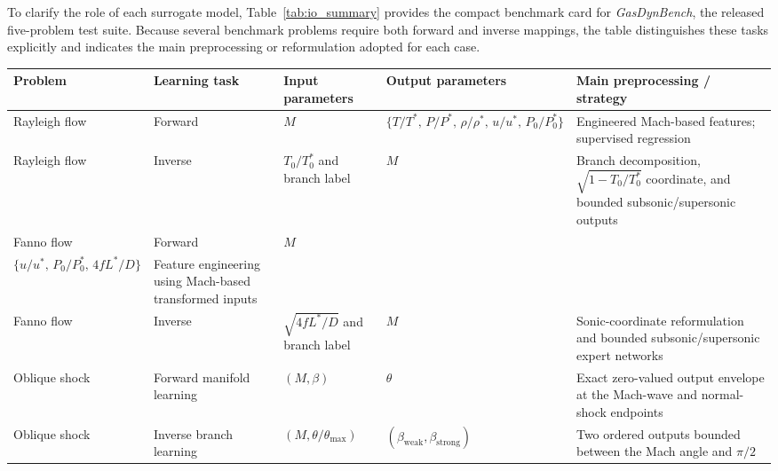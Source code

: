 \documentclass[preprint,12pt]{elsarticle}
\begin{document}
To clarify the role of each surrogate model, Table~\ref{tab:io_summary} provides the compact benchmark card for \emph{GasDynBench}, the released five-problem test suite. Because several benchmark problems require both forward and inverse mappings, the table distinguishes these tasks explicitly and indicates the main preprocessing or reformulation adopted for each case.

\FloatBarrier
\begin{landscape}
\begin{center}
\scriptsize
\setlength{\tabcolsep}{5pt}
\renewcommand{\arraystretch}{1.25}

\label{tab:io_summary}

\begin{tabular}{p{2.7cm} p{2.4cm} p{4.0cm} p{4.8cm} p{5.8cm}}
\toprule
\textbf{Problem} & \textbf{Learning task} & \textbf{Input parameters} & \textbf{Output parameters} & \textbf{Main preprocessing / strategy} \\
\midrule

Rayleigh flow
& Forward
& $M$
& $\{T/T^*,\,P/P^*,\,\rho/\rho^*,\,u/u^*,\,P_0/P_0^*\}$
& Engineered Mach-based features; supervised regression \\

Rayleigh flow
& Inverse
& $T_0/T_0^*$ and branch label
& $M$
& Branch decomposition, $\sqrt{1-T_0/T_0^*}$ coordinate, and bounded subsonic/supersonic outputs \\

Fanno flow
& Forward
& $M$
& \shortstack{$\{T/T^*,\,P/P^*,\,\rho/\rho^*\}$\\$\{u/u^*,\,P_0/P_0^*,\,4fL^*/D\}$}
& Feature engineering using Mach-based transformed inputs \\

Fanno flow
& Inverse
& $\sqrt{4fL^*/D}$ and branch label
& $M$
& Sonic-coordinate reformulation and bounded subsonic/supersonic expert networks \\

Oblique shock
& Forward manifold learning
& $(M,\beta)$
& $\theta$
& Exact zero-valued output envelope at the Mach-wave and normal-shock endpoints \\

Oblique shock
& Inverse branch learning
& $(M,\theta/\theta_{\max})$
& $(\beta_{\mathrm{weak}},\beta_{\mathrm{strong}})$
& Two ordered outputs bounded between the Mach angle and $\pi/2$ \\


\end{tabular}
\end{center}
\end{landscape}
\end{document}
